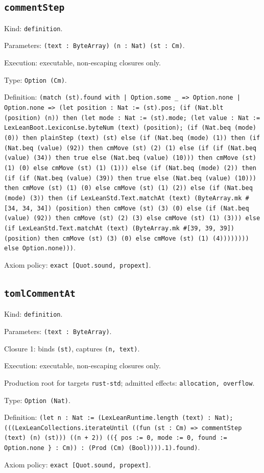 \documentclass[11pt]{article}
\begin{document}
\subsection*{\texttt{commentStep}}
\noindent Kind: \texttt{definition}.\par
\noindent Parameters: \texttt{(text : ByteArray) (n : Nat) (st : Cm)}.\par
\noindent Execution: executable, non-escaping closures only.\par
\noindent Type: \texttt{Option (Cm)}.\par
\noindent Definition: \texttt{(match (st).found with | Option.some \_ => Option.none | Option.none => (let position : Nat := (st).pos; (if (Nat.blt (position) (n)) then (let mode : Nat := (st).mode; (let value : Nat := LexLeanBoot.LexiconLse.byteNum (text) (position); (if (Nat.beq (mode) (0)) then plainStep (text) (st) else (if (Nat.beq (mode) (1)) then (if (Nat.beq (value) (92)) then cmMove (st) (2) (1) else (if (if (Nat.beq (value) (34)) then true else (Nat.beq (value) (10))) then cmMove (st) (1) (0) else cmMove (st) (1) (1))) else (if (Nat.beq (mode) (2)) then (if (if (Nat.beq (value) (39)) then true else (Nat.beq (value) (10))) then cmMove (st) (1) (0) else cmMove (st) (1) (2)) else (if (Nat.beq (mode) (3)) then (if LexLeanStd.Text.matchAt (text) (ByteArray.mk \#[34, 34, 34]) (position) then cmMove (st) (3) (0) else (if (Nat.beq (value) (92)) then cmMove (st) (2) (3) else cmMove (st) (1) (3))) else (if LexLeanStd.Text.matchAt (text) (ByteArray.mk \#[39, 39, 39]) (position) then cmMove (st) (3) (0) else cmMove (st) (1) (4)))))))) else Option.none)))}.\par
\noindent Axiom policy: \texttt{exact [Quot.sound, propext]}.\par
\subsection*{\texttt{tomlCommentAt}}
\noindent Kind: \texttt{definition}.\par
\noindent Parameters: \texttt{(text : ByteArray)}.\par
\noindent Closure 1: binds \texttt{(st)}, captures \texttt{(n, text)}.\par
\noindent Execution: executable, non-escaping closures only.\par
\noindent Production root for targets \texttt{rust-std}; admitted effects: \texttt{allocation, overflow}.\par
\noindent Type: \texttt{Option (Nat)}.\par
\noindent Definition: \texttt{(let n : Nat := (LexLeanRuntime.length (text) : Nat); (((LexLeanCollections.iterateUntil ((fun (st : Cm) => commentStep (text) (n) (st))) ((n + 2)) ((\{ pos := 0, mode := 0, found := Option.none \} : Cm)) : (Prod (Cm) (Bool)))).1).found)}.\par
\noindent Axiom policy: \texttt{exact [Quot.sound, propext]}.\par
\end{document}
